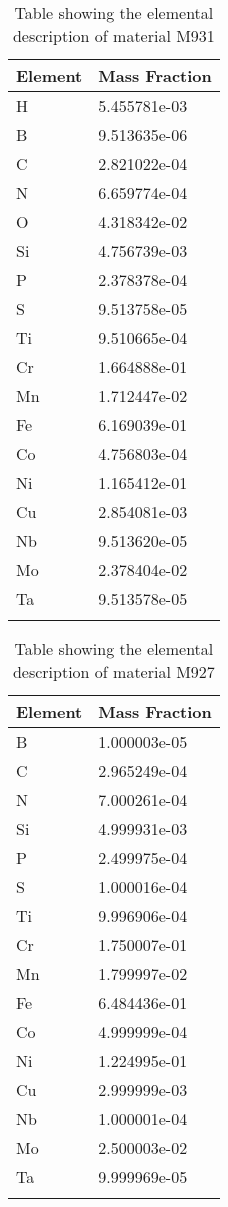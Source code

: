 \begin{centering}
\begin{longtable}[ht!]
{ p{} | p{} }
\hline
Element & Mass Fraction\\
\hline
H &  5.455781e-03\\
B &  9.513635e-06\\
C &  2.821022e-04\\
N &  6.659774e-04\\
O &  4.318342e-02\\
Si &  4.756739e-03\\
P &  2.378378e-04\\
S &  9.513758e-05\\
Ti &  9.510665e-04\\
Cr &  1.664888e-01\\
Mn &  1.712447e-02\\
Fe &  6.169039e-01\\
Co &  4.756803e-04\\
Ni &  1.165412e-01\\
Cu &  2.854081e-03\\
Nb &  9.513620e-05\\
Mo &  2.378404e-02\\
Ta &  9.513578e-05\\
\caption{Table showing the elemental description of material M931}
\label{table:material_UPDFW2}
\end{longtable}
\clearpage

\begin{longtable}[ht!]
{ p{} | p{} }
\hline
Element & Mass Fraction\\
\hline
B &  1.000003e-05\\
C &  2.965249e-04\\
N &  7.000261e-04\\
Si &  4.999931e-03\\
P &  2.499975e-04\\
S &  1.000016e-04\\
Ti &  9.996906e-04\\
Cr &  1.750007e-01\\
Mn &  1.799997e-02\\
Fe &  6.484436e-01\\
Co &  4.999999e-04\\
Ni &  1.224995e-01\\
Cu &  2.999999e-03\\
Nb &  1.000001e-04\\
Mo &  2.500003e-02\\
Ta &  9.999969e-05\\
\caption{Table showing the elemental description of material M927}
\label{table:material_PPWheelsDrives}
\end{longtable}
\clearpage


\end{centering}
